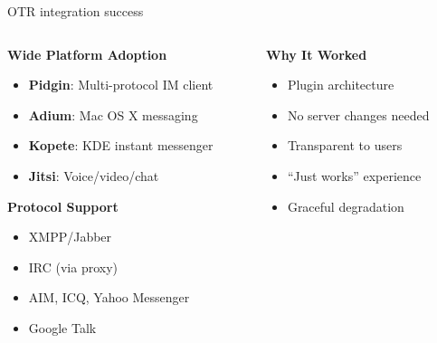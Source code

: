 \documentclass[aspectratio=169, lualatex, handout]{beamer}
\begin{document}
\begin{frame}{OTR integration success}
	\begin{columns}
		\begin{column}{0.6\textwidth}
			\textbf{Wide Platform Adoption}
			\begin{itemize}
				\item \textbf{Pidgin}: Multi-protocol IM client
				\item \textbf{Adium}: Mac OS X messaging
				\item \textbf{Kopete}: KDE instant messenger
				\item \textbf{Jitsi}: Voice/video/chat
			\end{itemize}
			\textbf{Protocol Support}
			\begin{itemize}
				\item XMPP/Jabber
				\item IRC (via proxy)
				\item AIM, ICQ, Yahoo Messenger
				\item Google Talk
			\end{itemize}
		\end{column}
		\begin{column}{0.4\textwidth}
			\textbf{Why It Worked}
			\begin{itemize}
				\item Plugin architecture
				\item No server changes needed
				\item Transparent to users
				\item ``Just works'' experience
				\item Graceful degradation
			\end{itemize}
		\end{column}
	\end{columns}
\end{frame}
\end{document}
